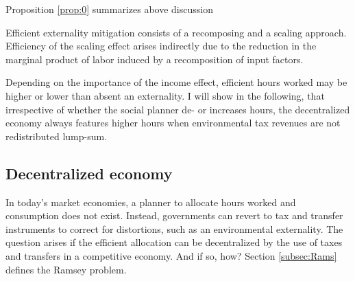 Proposition \ref{prop:0} summarizes above discussion
\begin{prop}\label{prop:0}
	Efficient externality mitigation consists of a recomposing and a scaling approach. Efficiency of the scaling effect arises indirectly due to the reduction in the marginal product of labor induced by a recomposition of input factors.
\end{prop}


Depending on the importance of the income effect, efficient hours worked may be higher or lower than  absent an externality. %
I will show in the following, that irrespective of whether the social planner de- or increases hours, the decentralized economy always features higher hours when environmental tax revenues are not redistributed lump-sum. 

\begin{comment}
\hrule
One can show that the total effect of a drop in the fossil labor share on hours worked is positive, i.e. $\frac{dh_{FB}}{ds}>0$, if $\theta<\frac{\varepsilon}{\varepsilon-s}$. If the income effect dominates, the social planner increases hours worked as the economy becomes less productive. 
Under the value for $\theta$ suggested by \cite{Boppart2019LaborPerspectiveb}, the efficient scale effect is to increase hours worked. When, however, the substitution effect outweighs or dominates the income effect - as commonly assumed in the public finance literature \citep{Heathcote2017OptimalFramework, LansBovenberg1994EnvironmentalTaxation, LansBovenberg1996OptimalAnalyses} \tr{CHECK this}!.
Nevertheless, the level of hours worked exceeds the efficient level irrespective of $\theta$ when no lump-sum transfers are available. 
When the efficient level of hours increases, though, the fossil labor share reduces even more to outweigh the increase in the externality.

content...
\end{comment}
\subsection{Decentralized economy}\label{subsec:decen_ec}

In today's market economies, a planner to allocate hours worked and consumption does not exist. Instead, governments can revert to tax and transfer instruments to correct for distortions, such as an environmental externality. The question arises if the efficient allocation can be decentralized by the use of taxes and transfers in a competitive economy. And if so, how? Section \ref{subsec:Rams} defines the Ramsey problem. %

